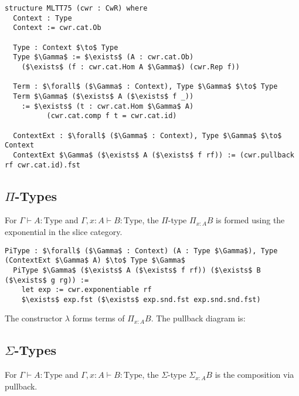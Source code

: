 \documentclass{article}
\begin{document}
\begin{lstlisting}[mathescape=true]
structure MLTT75 (cwr : CwR) where
  Context : Type
  Context := cwr.cat.Ob

  Type : Context $\to$ Type
  Type $\Gamma$ := $\exists$ (A : cwr.cat.Ob)
    ($\exists$ (f : cwr.cat.Hom A $\Gamma$) (cwr.Rep f))

  Term : $\forall$ ($\Gamma$ : Context), Type $\Gamma$ $\to$ Type
  Term $\Gamma$ ($\exists$ A ($\exists$ f _))
    := $\exists$ (t : cwr.cat.Hom $\Gamma$ A)
          (cwr.cat.comp f t = cwr.cat.id)

  ContextExt : $\forall$ ($\Gamma$ : Context), Type $\Gamma$ $\to$ Context
  ContextExt $\Gamma$ ($\exists$ A ($\exists$ f rf)) := (cwr.pullback rf cwr.cat.id).fst
\end{lstlisting}

\newpage
\subsection{$\Pi$-Types}
For $\Gamma \vdash A : \text{Type}$ and $\Gamma, x : A \vdash B : \text{Type}$, the $\Pi$-type $\Pi_{x : A} B$ is formed using the exponential in the slice category.

\begin{lstlisting}[mathescape=true]
  PiType : $\forall$ ($\Gamma$ : Context) (A : Type $\Gamma$), Type (ContextExt $\Gamma$ A) $\to$ Type $\Gamma$
  PiType $\Gamma$ ($\exists$ A ($\exists$ f rf)) ($\exists$ B ($\exists$ g rg)) :=
    let exp := cwr.exponentiable rf
    $\exists$ exp.fst ($\exists$ exp.snd.fst exp.snd.snd.fst)
\end{lstlisting}

The constructor $\lambda$ forms terms of $\Pi_{x : A} B$. The pullback diagram is:


\subsection{$\Sigma$-Types}
For $\Gamma \vdash A : \text{Type}$ and $\Gamma, x : A \vdash B : \text{Type}$, the $\Sigma$-type $\Sigma_{x : A} B$ is the composition via pullback.
\end{document}
